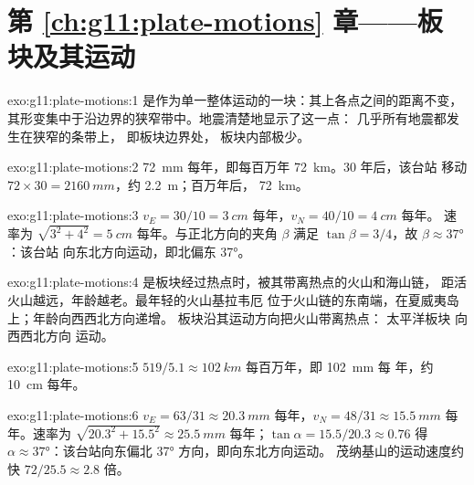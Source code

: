 \section*{第 \ref{ch:g11:plate-motions} 章——板块及其运动}

\begin{solution}{exo:g11:plate-motions:1}
是作为单一整体运动的一块：其上各点之间的距离不变，
其形变集中于沿边界的狭窄带中。地震清楚地显示了这一点：
几乎所有地震都发生在狭窄的条带上，
即板块边界处，
板块内部极少。
\end{solution}

\begin{solution}{exo:g11:plate-motions:2}
\qty{72}{mm} 每年，即每百万年 \qty{72}{km}。30 年后，该台站
移动 $72 \times 30 = \qty{2160}{mm}$，约 \qty{2.2}{m}；百万年后，
\qty{72}{km}。
\end{solution}

\begin{solution}{exo:g11:plate-motions:3}
$v_E = 30/10 = \qty{3}{cm}$ 每年，$v_N = 40/10 = \qty{4}{cm}$ 每年。
速率为 $\sqrt{3^2 + 4^2} = \qty{5}{cm}$ 每年。与正北方向的夹角 $\beta$
满足 $\tan\beta = 3/4$，故 $\beta \approx \ang{37}$：该台站
向东北方向运动，即北偏东 \ang{37}。
\end{solution}

\begin{solution}{exo:g11:plate-motions:4}
是板块经过热点时，被其带离热点的火山和海山链，
距活火山越远，年龄越老。最年轻的火山基拉韦厄
位于火山链的东南端，在夏威夷岛上；年龄向西西北方向递增。
板块沿其运动方向把火山带离热点：
太平洋板块
向西西北方向
运动。
\end{solution}

\begin{solution}{exo:g11:plate-motions:5}
$519/5.1 \approx \qty{102}{km}$ 每百万年，即 \qty{102}{mm} 每
年，约 \qty{10}{cm} 每年。
\end{solution}

\begin{solution}{exo:g11:plate-motions:6}
$v_E = 63/31 \approx \qty{20.3}{mm}$ 每年，$v_N = 48/31 \approx
\qty{15.5}{mm}$ 每年。速率为 $\sqrt{20.3^2 + 15.5^2} \approx
\qty{25.5}{mm}$ 每年；$\tan\alpha = 15.5/20.3 \approx 0.76$ 得 $\alpha
\approx \ang{37}$：该台站向东偏北 \ang{37} 方向，即向东北方向运动。
茂纳基山的运动速度约快 $72/25.5 \approx 2.8$ 倍。
\end{solution}

